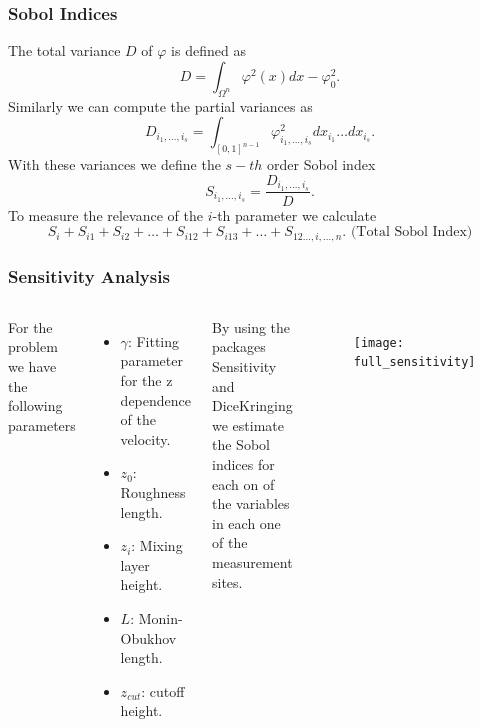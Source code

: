 \documentclass[11pt]{beamer}
\theoremstyle{plain}
\theoremstyle{definition}
\newcommand\ChangeFont{\fontsize{9}{7.2}\selectfont}
\begin{document}
\begin{frame}
\frametitle{Sobol Indices}
The total variance $D$ of $\varphi$ is defined as
\ChangeFont
\begin{equation*}
D=\int_{\Omega^{n}}\varphi^{2}(x)dx-\varphi_{0}^{2}.
\end{equation*}
Similarly we can compute the partial variances as
\begin{equation*}
D_{i_{1},\ldots,i_{s}}=\int_{[0,1]^{n-1}}\varphi^{2}_{i_{1},\ldots,i_{s}}dx_{i_{1}}\ldots dx_{i_{s}}.
\end{equation*}
With these variances we define the $s-th$ order  Sobol index
\begin{equation*} 
S_{i_{1},\ldots,i_{s}}=\frac{D_{i_{1},\ldots,i_{s}}}{D}.
\end{equation*}
To measure the relevance of the $i$-th parameter we calculate
\begin{equation*}
S_{i}+S_{i1}+S_{i2}+\ldots+S_{i12}+S_{i13}+\ldots+S_{12\ldots,i,\ldots, n}.
\text{ (Total Sobol Index)}
\end{equation*}
\end{frame}







\begin{frame}
\frametitle{Sensitivity Analysis}
\begin{columns}[c]
\column{1.5in}
\ChangeFont
For the problem we have the following parameters
\begin{itemize}
\item $\gamma$: Fitting parameter for the z dependence of the velocity.
\item $z_{0}$: Roughness length.
\item $z_{i}$: Mixing layer height.
\item $L$: Monin-Obukhov length.
\item $z_{cut}$: cutoff height.
\end{itemize}

By using the packages Sensitivity and DiceKringing we estimate the Sobol indices 
for each on of the variables in each one of the measurement sites. 
\column{1.5in}
\begin{figure}
\texttt{[image: full\_sensitivity]}
\end{figure}

\end{columns}
\end{frame}
\end{document}
